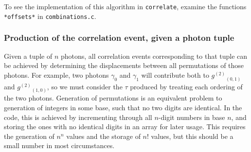 \documentclass{article}
\newcommand{\correlate}{\texttt{correlate}}
\newcommand{\gn}[1]{\ensuremath{g^{(#1)}}}
\newcommand{\abs}[1]{\ensuremath{\left|#1\right|}}
\newcommand{\photon}{\ensuremath{\gamma}}
\newcommand{\photons}{\ensuremath{\Gamma}}
\newcommand{\timewindow}{\ensuremath{\xi}}
\begin{document}
%
%
%
To see the implementation of this algorithm in \correlate, examine the functions \texttt{*offsets*} in \texttt{combinations.c}.

\subsubsection{Production of the correlation event, given a photon tuple}
Given a tuple of $n$ photons, all correlation events corresponding to that tuple can be achieved by determining the displacements between all permutations of those photons. For example, two photons $\photon_{0}$ and $\photon_{1}$ will contribute both to $\gn{2}_{(0,1)}$ and $\gn{2}_{(1,0)}$, so we must consider the $\tau$ produced by treating each ordering of the two photons. Generation of permutations is an equivalent problem to generation of integers in some base, such that no two digits are identical. In the code, this is achieved by incrementing through all $n$-digit numbers in base $n$, and storing the ones with no identical digits in an array for later usage. This requires the generation of $n^{n}$ values and the storage of $n!$ values, but this should be a small number in most circumstances. 
\end{document}
